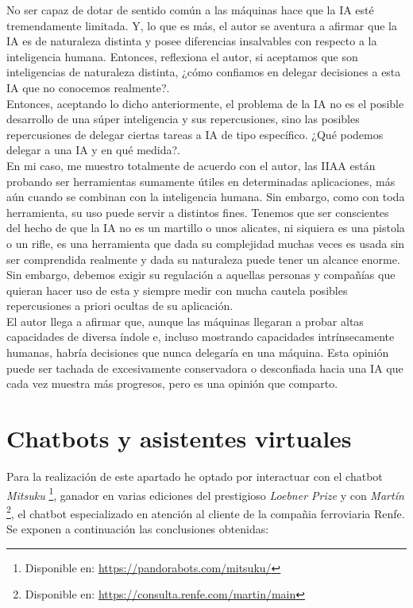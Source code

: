 \documentclass[final]{CSP}
\begin{document}
No ser capaz de dotar de sentido común a las máquinas hace que la IA esté tremendamente limitada.
Y, lo que es más, el autor se aventura a afirmar que la IA es de naturaleza distinta y posee
diferencias insalvables con respecto a la inteligencia humana. Entonces, reflexiona el autor,
si aceptamos que son inteligencias de naturaleza distinta, ¿cómo confiamos en delegar decisiones
a esta IA que no conocemos realmente?.\\

Entonces, aceptando lo dicho anteriormente, el problema de la IA no es el posible desarrollo de 
una súper inteligencia y sus repercusiones, sino las posibles repercusiones de delegar ciertas 
tareas a IA de tipo específico. ¿Qué podemos delegar a una IA y en qué medida?. \\

En mi caso, me muestro totalmente de acuerdo con el autor, las IIAA están probando ser herramientas
sumamente útiles en determinadas aplicaciones, más aún cuando se combinan con la inteligencia
humana. Sin embargo, como con toda herramienta, su uso puede servir a distintos fines. Tenemos
que ser conscientes del hecho de que la IA no es un martillo o unos alicates, ni siquiera es una
pistola o un rifle, es una herramienta que dada su complejidad muchas veces es usada sin
ser comprendida realmente y dada su naturaleza puede tener un alcance enorme. Sin embargo, debemos
exigir su regulación a aquellas personas y compañías que quieran hacer uso de esta y siempre medir
con mucha cautela posibles repercusiones a priori ocultas de su aplicación.\\

El autor llega a afirmar que, aunque las máquinas llegaran a probar altas capacidades de diversa
índole e, incluso mostrando capacidades intrínsecamente humanas, habría decisiones que nunca 
delegaría en una máquina. Esta opinión puede ser tachada de excesivamente conservadora o 
desconfiada hacia una IA que cada vez muestra más progresos, pero es una opinión que comparto.



\section{Chatbots y asistentes virtuales}

Para la realización de este apartado he optado por interactuar con el chatbot \textit{Mitsuku}
\footnote{Disponible en: \url{https://pandorabots.com/mitsuku/}}, ganador en varias ediciones 
del prestigioso \textit{Loebner Prize} y con \textit{Martín} \footnote{Disponible en:
\url{https://consulta.renfe.com/martin/main}}, el chatbot especializado en atención al cliente de la
compañia ferroviaria Renfe. Se exponen a continuación las conclusiones obtenidas:
\end{document}
